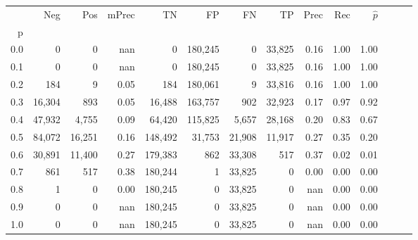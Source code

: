 \begin{tabular}{rrrrrrrrrrrrrr}
\toprule
{} &     Neg &     Pos & mPrec &       TN &       FP &      FN &      TP &  Prec &   Rec & $\hat{p}$ \\
p   &         &         &       &          &          &         &         &       &       &           \\
\midrule
0.0 &       0 &       0 &   nan &        0 &  180,245 &       0 &  33,825 &  0.16 &  1.00 &      1.00 \\
0.1 &       0 &       0 &   nan &        0 &  180,245 &       0 &  33,825 &  0.16 &  1.00 &      1.00 \\
0.2 &     184 &       9 &  0.05 &      184 &  180,061 &       9 &  33,816 &  0.16 &  1.00 &      1.00 \\
0.3 &  16,304 &     893 &  0.05 &   16,488 &  163,757 &     902 &  32,923 &  0.17 &  0.97 &      0.92 \\
0.4 &  47,932 &   4,755 &  0.09 &   64,420 &  115,825 &   5,657 &  28,168 &  0.20 &  0.83 &      0.67 \\
0.5 &  84,072 &  16,251 &  0.16 &  148,492 &   31,753 &  21,908 &  11,917 &  0.27 &  0.35 &      0.20 \\
0.6 &  30,891 &  11,400 &  0.27 &  179,383 &      862 &  33,308 &     517 &  0.37 &  0.02 &      0.01 \\
0.7 &     861 &     517 &  0.38 &  180,244 &        1 &  33,825 &       0 &  0.00 &  0.00 &      0.00 \\
0.8 &       1 &       0 &  0.00 &  180,245 &        0 &  33,825 &       0 &   nan &  0.00 &      0.00 \\
0.9 &       0 &       0 &   nan &  180,245 &        0 &  33,825 &       0 &   nan &  0.00 &      0.00 \\
1.0 &       0 &       0 &   nan &  180,245 &        0 &  33,825 &       0 &   nan &  0.00 &      0.00 \\
\bottomrule
\end{tabular}
